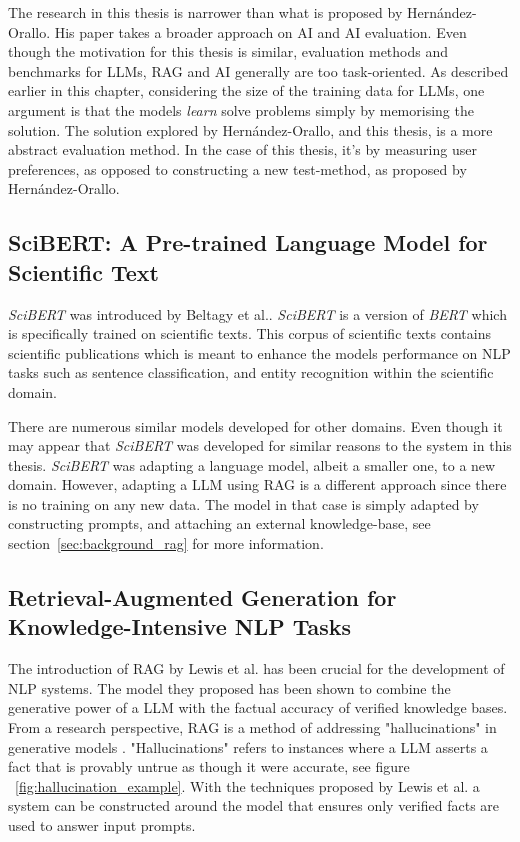 The research in this thesis is narrower than what is proposed by Hernández-Orallo. His paper takes a broader approach on AI and AI evaluation. Even though the motivation for this thesis is similar, evaluation methods and benchmarks for \gls{LLM}s, \gls{RAG} and AI generally are too task-oriented. As described earlier in this chapter, considering the size of the training data for \gls{LLM}s, one argument is that the models \textit{learn} solve problems simply by memorising the solution. The solution explored by Hernández-Orallo, and this thesis, is a more abstract evaluation method. In the case of this thesis, it’s by measuring user preferences, as opposed to constructing a new test-method, as proposed by Hernández-Orallo.


\subsection{SciBERT: A Pre-trained Language Model for Scientific Text}


\textit{SciBERT} was introduced by Beltagy et al.\cite{beltagy_scibert_2019-1}. \textit{SciBERT} is a version of \textit{BERT} \cite{devlin_bert_2019-2} which is specifically trained on scientific texts. This corpus of scientific texts contains scientific publications which is meant to enhance the models performance on \gls{NLP} tasks such as sentence classification, and entity recognition within the scientific domain.


There are numerous similar models developed for other domains. Even though it may appear that \textit{SciBERT} was developed for similar reasons to the system in this thesis. \textit{SciBERT} was adapting a language model, albeit a smaller one, to a new domain. However, adapting a \gls{LLM} using \gls{RAG} is a different approach since there is no training on any new data. The model in that case is simply adapted by constructing prompts, and attaching an external knowledge-base, see section~\ref{sec:background_rag} for more information.


\subsection{Retrieval-Augmented Generation for Knowledge-Intensive NLP Tasks}
\label{sec:related_works_rag}


The introduction of \gls{RAG} by Lewis et al. has been crucial for the development of \gls{NLP} systems. The model they proposed has been shown to combine the generative power of a \gls{LLM} with the factual accuracy of verified knowledge bases. From a research perspective, \gls{RAG} is a method of addressing "hallucinations" in generative models \cite{lewis_retrieval-augmented_2021}. "Hallucinations" refers to instances where a \gls{LLM} asserts a fact that is provably untrue as though it were accurate, see figure ~\ref{fig:hallucination_example}. With the techniques proposed by Lewis et al. a system can be constructed around the model that ensures only verified facts are used to answer input prompts.


